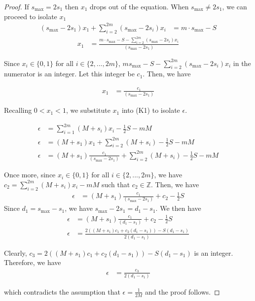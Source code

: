 \documentclass[10pt,a4paper]{amsart}
\begin{document}
\begin{proof}
If $s_{\max} = 2s_1$ then $x_1$ drops out of the equation.  When $s_{\max} \ne 2s_1$, we can proceed to isolate $x_1$
\begin{align*}
  (s_{\max} - 2s_1)x_1 + \sum_{i=2}^{2m} (s_{\max} - 2s_i)x_i&= m\cdot s_{\max} - S
\end{align*}
\begin{align*}
  x_1 &= \frac{m\cdot s_{\max} - S - \sum_{i=2}^{2m} (s_{\max} - 2s_i)x_i}{(s_{\max} - 2s_1)}
\end{align*}

Since $x_i \in \{0,1\}$ for all $i\in\{2,...,2m\}$, $m s_{\max} - S - \sum_{i=2}^{2m} (s_{\max} - 2s_i)x_i$ in the numerator is an integer. Let this integer be $c_1$. Then, we have

\begin{align*}
    x_1 &= \frac{c_1}{(s_{\max} - 2s_1)}
\end{align*}

Recalling $0<x_1<1$, we substitute $x_1$ into (K1) to isolate $\epsilon$.

\begin{align*}
    \epsilon &= \sum_{i=1}^{2m}(M+s_i)x_i - \frac{1}{2}S - mM \\
    \epsilon &= (M+s_1)x_1 + \sum_{i=2}^{2m}(M+s_i) - \frac{1}{2}S - mM\\
    \epsilon &= (M+s_1)\frac{c_1}{(s_{\max} - 2s_1)} + \sum_{i=2}^{2m}(M+s_i) - \frac{1}{2}S - mM 
\end{align*}

Once more, since $x_i \in \{0,1\}$ for all $i\in\{2,...,2m\}$, we have $\displaystyle c_2 = \sum_{i=2}^{2m} (M + s_i)x_i - mM$ such that $c_2 \in \mathbb{Z}$. Then, we have
\begin{align*}
    \epsilon &= (M+s_1)\frac{c_1}{(s_{\max} - 2s_1)} + c_2 - \frac{1}{2}S
\end{align*}
Since $d_1 = s_{\max} - s_1$, we have  $s_{\max} - 2s_1 = d_1 - s_1$. We then have 
\begin{align*}
    \epsilon &= (M+s_1)\frac{c_1}{(d_1 - s_1)} + c_2 - \frac{1}{2}S\\
    \epsilon &= \frac{2((M+s_1)c_1+c_2(d_1 - s_1))-S(d_1 - s_1)}{2(d_1 - s_1)}
\end{align*}

Clearly, $c_3 = 2((M+s_1)c_1+c_2(d_1 - s_1))-S(d_1 - s_1)$ is an integer. Therefore, we have 
\begin{align*}
   \epsilon &= \frac{c_3}{2(d_1 - s_1)}
\end{align*}

which contradicts the assumption that $\epsilon = \frac{1}{2M}$ and the proof follows. 

    
\end{proof}
\end{document}
